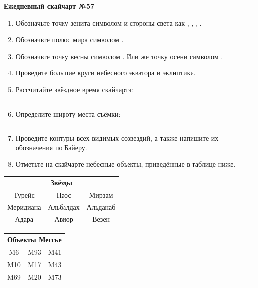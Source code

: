 \documentclass{./SAS-class-skygen}
\begin{document}
    
    
    
	\begin{center}
		\large\textbf{Ежедневный скайчарт №57}
	\end{center}

	\begin{enumerate}
		\item Обозначьте точку зенита символом  и стороны света как , , , .
		\item Обозначьте полюс мира символом .
		\item Обозначьте точку весны символом \Aries. Или же точку осени символом \Libra.
		\item Проведите большие круги небесного экватора и эклиптики.
		\item Рассчитайте звёздное время скайчарта: \rule{2cm}{0.4pt}
		\item Определите широту места съёмки: \rule{2cm}{0.4pt}
		\item Проведите контуры всех видимых созвездий, а также напишите их обозначения по Байеру.
		\item Отметьте на скайчарте небесные объекты, приведённые в таблице ниже.
	\end{enumerate}
	
    \vspace{0.5cm}

    \begin{table}[h!]
    \centering
    \begin{tabular}{ccc}
    \multicolumn{3}{c}{\textbf{Звёзды}} \\ Турейс & Наос & Мирзам \\
Меридиана & Альбалдах & Альданаб \\
Адара & Авиор & Везен \\

\end{tabular}
    \hfill
    \begin{tabular}{ccc}
    \multicolumn{3}{c}{\textbf{Объекты Мессье}} \\ M6 & M93 & M41 \\
M10 & M17 & M43 \\
M69 & M20 & M73 \\

\end{tabular}
    \end{table}
	
\end{document}
